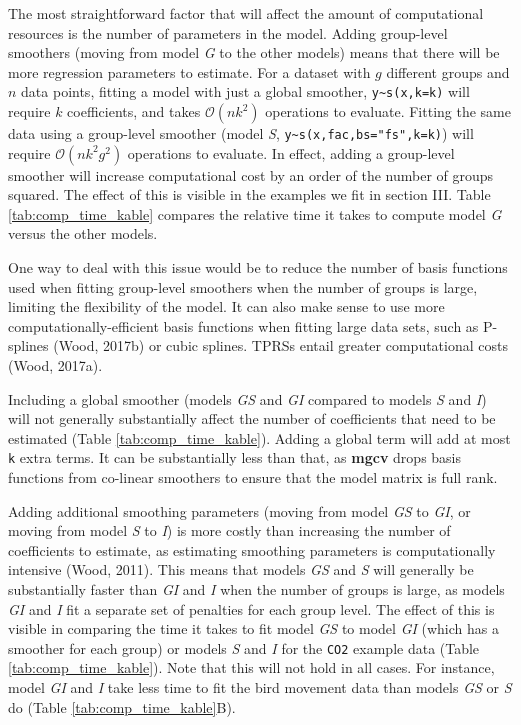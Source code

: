 \documentclass[12pt]{article}
\begin{document}
The most straightforward factor that will affect the amount of
computational resources is the number of parameters in the model. Adding
group-level smoothers (moving from model \emph{G} to the other models)
means that there will be more regression parameters to estimate. For a
dataset with \(g\) different groups and \(n\) data points, fitting a
model with just a global smoother, \texttt{y\textasciitilde{}s(x,k=k)}
will require \(k\) coefficients, and takes \(\mathcal{O}(nk^2)\)
operations to evaluate. Fitting the same data using a group-level
smoother (model \emph{S},
\texttt{y\textasciitilde{}s(x,fac,bs="fs",k=k)}) will require
\(\mathcal{O}(nk^2g^2)\) operations to evaluate. In effect, adding a
group-level smoother will increase computational cost by an order of the
number of groups squared. The effect of this is visible in the examples
we fit in section III. Table \ref{tab:comp_time_kable} compares the
relative time it takes to compute model \emph{G} versus the other
models.

One way to deal with this issue would be to reduce the number of basis
functions used when fitting group-level smoothers when the number of
groups is large, limiting the flexibility of the model. It can also make
sense to use more computationally-efficient basis functions when fitting
large data sets, such as P-splines (Wood, 2017b) or cubic splines. TPRSs
entail greater computational costs (Wood, 2017a).

Including a global smoother (models \emph{GS} and \emph{GI} compared to
models \emph{S} and \emph{I}) will not generally substantially affect
the number of coefficients that need to be estimated (Table
\ref{tab:comp_time_kable}). Adding a global term will add at most
\texttt{k} extra terms. It can be substantially less than that, as
\textbf{mgcv} drops basis functions from co-linear smoothers to ensure
that the model matrix is full rank.

Adding additional smoothing parameters (moving from model \emph{GS} to
\emph{GI}, or moving from model \emph{S} to \emph{I}) is more costly
than increasing the number of coefficients to estimate, as estimating
smoothing parameters is computationally intensive (Wood, 2011). This
means that models \emph{GS} and \emph{S} will generally be substantially
faster than \emph{GI} and \emph{I} when the number of groups is large,
as models \emph{GI} and \emph{I} fit a separate set of penalties for
each group level. The effect of this is visible in comparing the time it
takes to fit model \emph{GS} to model \emph{GI} (which has a smoother
for each group) or models \emph{S} and \emph{I} for the \texttt{CO2}
example data (Table \ref{tab:comp_time_kable}). Note that this will not
hold in all cases. For instance, model \emph{GI} and \emph{I} take less
time to fit the bird movement data than models \emph{GS} or \emph{S} do
(Table \ref{tab:comp_time_kable}B).
\end{document}
